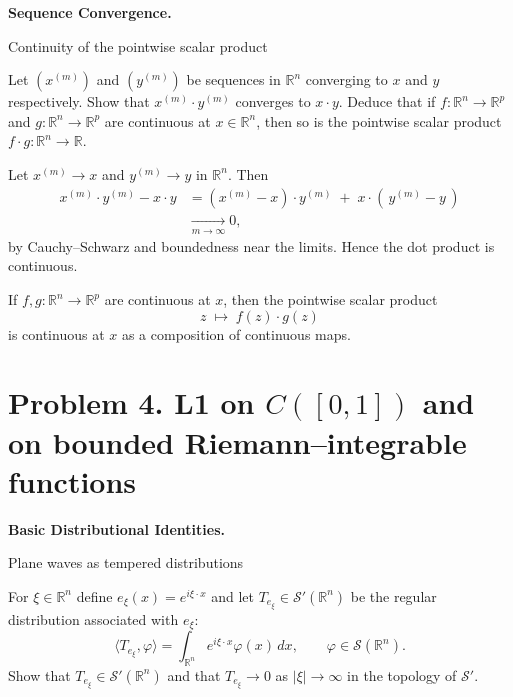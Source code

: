 \begin{problem}[CP-II-0043]
\label{prob:cp-ii-0043}
\textbf{Sequence Convergence.}

\hspace*{1.5em}Continuity of the pointwise scalar product

Let $(x^{(m)})$ and $(y^{(m)})$ be sequences in $\mathbb{R}^n$ converging to $x$ and $y$ respectively.
Show that $x^{(m)}\cdot y^{(m)}$ converges to $x\cdot y$. Deduce that if
$f:\mathbb{R}^n\to\mathbb{R}^p$ and $g:\mathbb{R}^n\to\mathbb{R}^p$ are continuous at
$x\in\mathbb{R}^n$, then so is the pointwise scalar product
$f\cdot g:\mathbb{R}^n\to\mathbb{R}$.
\end{problem}

\begin{solution}
Let $x^{(m)}\to x$ and $y^{(m)}\to y$ in $\mathbb{R}^n$. Then
\begin{align*}
	x^{(m)}\!\cdot y^{(m)} - x\!\cdot y
	&= (x^{(m)}-x)\!\cdot y^{(m)} \;+\; x\!\cdot (\,y^{(m)}-y\,) \\
	&\xrightarrow[m\to\infty]{} 0,
\end{align*}
by Cauchy--Schwarz and boundedness near the limits. Hence the dot product is continuous.

If $f,g:\mathbb{R}^n\to\mathbb{R}^p$ are continuous at $x$, then the pointwise scalar product
\[
z \;\longmapsto\; f(z)\cdot g(z)
\]
is continuous at $x$ as a composition of continuous maps.

\section*{Problem 4. {L1} on $C([0,1])$ and on bounded Riemann--integrable functions}
\end{solution}

\begin{problem}[CP-II-0044]
\label{prob:cp-ii-0044}
\textbf{Basic Distributional Identities.}

\hspace*{1.5em}Plane waves as tempered distributions

For $\xi\in\mathbb{R}^n$ define $e_\xi(x)=e^{i\xi\cdot x}$ and let
$T_{e_\xi}\in\mathcal{S}'(\mathbb{R}^n)$ be the regular distribution
associated with $e_\xi$:
\[
\langle T_{e_\xi},\varphi\rangle
= \int_{\mathbb{R}^n} e^{i\xi\cdot x}\varphi(x)\,dx,
\qquad \varphi\in\mathcal{S}(\mathbb{R}^n).
\]
Show that $T_{e_\xi}\in\mathcal{S}'(\mathbb{R}^n)$ and that
$T_{e_\xi}\to 0$ as $|\xi|\to\infty$ in the topology of $\mathcal{S}'$.
\end{problem}

